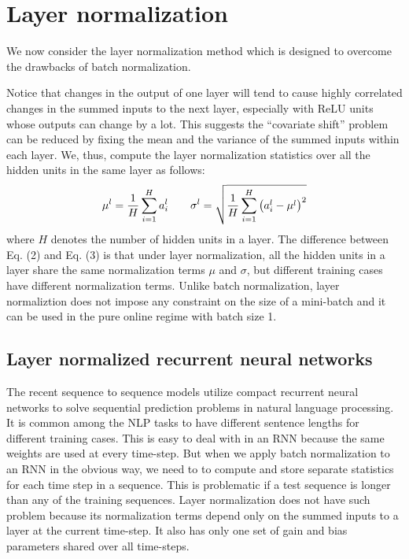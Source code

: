 \documentclass{article}
\begin{document}
\section{Layer normalization}

We now consider the layer normalization method which is designed to overcome the drawbacks of batch normalization. 

Notice that changes in the output of one layer will tend to cause highly correlated changes in the summed inputs to the next layer, especially with ReLU units whose outputs can change by a lot.  
This suggests the ``covariate shift'' problem can be reduced by fixing the mean and the variance of the summed inputs within each layer. We, thus, compute the layer normalization statistics over all the hidden units in the same layer as follows:
\begin{equation}
\mu^l = \frac{1}{H}\sum_{i = 1}^H  {a}^l_i
\qquad
\sigma^l = \sqrt{\frac{1}{H}\sum_{i = 1}^H  \left( {a}^l_i  - \mu^l \right)^2}
\label{eq:ln}
\end{equation}
where $H$ denotes the number of hidden units in a layer. The difference between Eq. (2) and Eq. (3) is that under layer normalization, all the hidden units in a layer share the same normalization terms $\mu$ and $\sigma$, but different training cases have different normalization terms. 
Unlike batch normalization, layer normaliztion does not impose any constraint on the size of a mini-batch and it can be used in the pure online regime with batch size 1. 

\subsection{Layer normalized recurrent neural networks}

The recent sequence to sequence models \citep{sutskever2014sequence} utilize compact recurrent neural networks to solve sequential prediction problems in natural language processing.  It is common among the NLP tasks to have different sentence lengths for different training cases. This is easy to deal with in an RNN because the same weights are used at every time-step. But when we apply batch normalization to an RNN in the obvious way, we need to to compute and store separate statistics for each time step in a sequence. This is problematic if a test sequence is longer than any of the training sequences. Layer normalization does not have such problem because its normalization terms depend only on the summed inputs to a layer at the current time-step. It also has only one set of gain and bias parameters shared over all time-steps.
\end{document}
